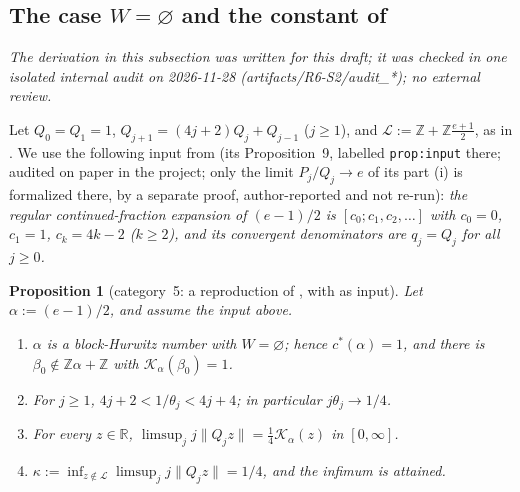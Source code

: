 \documentclass[11pt]{amsart}
\newtheorem{proposition}[theorem]{Proposition}
\theoremstyle{definition}
\theoremstyle{remark}
\newcommand{\Z}{\mathbb{Z}}
\newcommand{\R}{\mathbb{R}}
\newcommand{\dist}[1]{\lVert #1\rVert}
\newcommand{\KL}{\mathcal{K}}
\begin{document}
\subsection{The case $W=\varnothing$ and the constant of \cite{D5}}\label{subsec:W-empty}
\emph{The derivation in this subsection was written for this draft; it was checked in one isolated internal audit on 2026-11-28 (artifacts/R6-S2/audit\_*); no external review.}

Let $Q_0=Q_1=1$, $Q_{j+1}=(4j+2)Q_j+Q_{j-1}$ ($j\ge1$), and $\mathcal L:=\Z+\Z\frac{e+1}2$, as in \cite{D5}. We use
the following input from \cite{D5} (its Proposition~9, labelled \texttt{prop:input} there; audited on paper in
the project; only the limit $P_j/Q_j\to e$ of its part (i) is formalized there, by a separate proof,
author-reported and not re-run): \emph{the regular continued-fraction expansion of
$(e-1)/2$ is $[c_0;c_1,c_2,\dots]$ with $c_0=0$, $c_1=1$, $c_k=4k-2$ ($k\ge2$), and its convergent denominators are
$q_j=Q_j$ for all $j\ge0$.}

\begin{proposition}[category~5: a reproduction of {\cite[Theorem~1]{D5}}, with {\cite[Proposition~9]{D5}} as input]\label{prop:W-empty}
Let $\alpha:=(e-1)/2$, and assume the input above.
\begin{enumerate}
\item[(i)] $\alpha$ is a block-Hurwitz number with $W=\varnothing$; hence $c^*(\alpha)=1$, and there is
$\beta_0\notin\Z\alpha+\Z$ with $\KL_\alpha(\beta_0)=1$.
\item[(ii)] For $j\ge1$, $4j+2<1/\theta_j<4j+4$; in particular $j\theta_j\to1/4$.
\item[(iii)] For every $z\in\R$, $\limsup_jj\dist{Q_jz}=\frac14\KL_\alpha(z)$ in $[0,\infty]$.
\item[(iv)] $\kappa:=\inf_{z\notin\mathcal L}\limsup_jj\dist{Q_jz}=1/4$, and the infimum is attained.
\end{enumerate}
\end{proposition}
\end{document}
